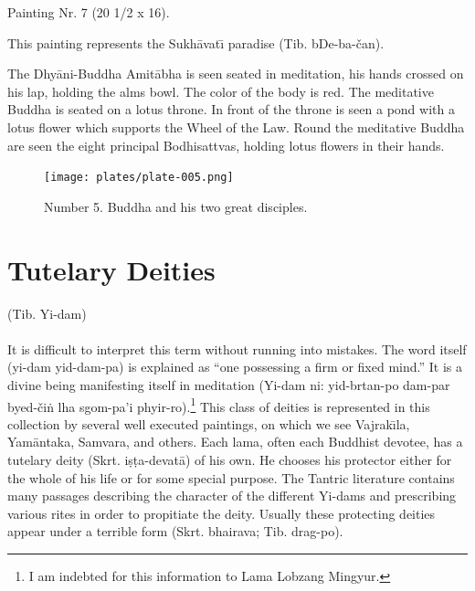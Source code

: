 \documentclass[a4paper, 12pt, oneside]{article}
\begin{document}
\bigskip

Painting Nr. 7 (20 1/2 x 16).

\bigskip

This painting represents the Sukh\={a}vat\={\i} paradise (Tib. bDe-ba-čan).

The Dhy\={a}ni-Buddha Amit\={a}bha is seen seated in meditation, his hands crossed on his lap, holding the alms bowl. The color of the body is red. The meditative Buddha is seated on a lotus throne. In front of the throne is seen a pond with a lotus flower which supports the Wheel of the Law. Round the meditative Buddha are seen the eight principal Bodhisattvas, holding lotus flowers in their hands. 

\clearpage
\vspace*{\fill}
\begin{figure}[H]
\centering
\texttt{[image: plates/plate-005.png]}
\caption*{Number 5. Buddha and his two great disciples.}
\end{figure}
\vspace*{\fill}
\clearpage
\section{Tutelary Deities}
\begin{center}
(Tib. Yi-dam)
\end{center}
\paragraph{}
It is difficult to interpret this term without running into mistakes. The word itself (yi-dam yid-dam-pa) is explained as ``one possessing a firm or fixed mind.'' It is a divine being manifesting itself in meditation (Yi-dam ni: yid-brtan-po dam-par byed-či\.{n} lha sgom-pa'i phyir-ro).\footnote{I am indebted for this information to Lama Lobzang Mingyur.} This class of deities is represented in this collection by several well executed paintings, on which we see Vajrak\={\i}la, Yam\={a}ntaka, Samvara, and others. Each lama, often each Buddhist devotee, has a tutelary deity (Skrt. i\d{s}\d{t}a-devat\={a}) of his own. He chooses his protector either for the whole of his life or for some special purpose. The Tantric literature contains many passages describing the character of the different Yi-dams and prescribing various rites in order to propitiate the deity. Usually these protecting deities appear under a terrible form (Skrt. bhairava; Tib. drag-po).
\end{document}

